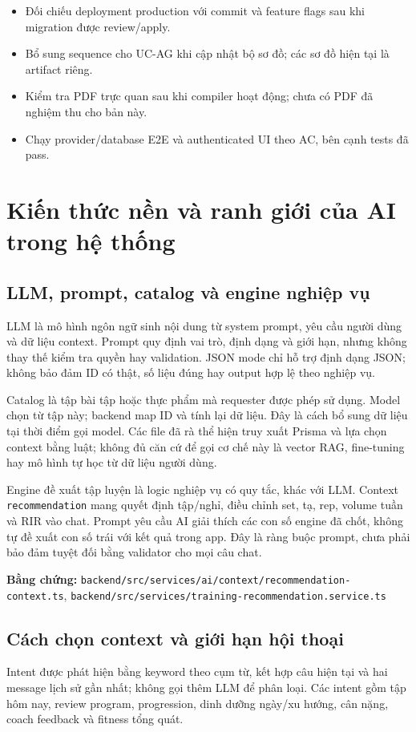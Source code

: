 \documentclass[12pt,a4paper]{article}
\newcommand{\code}[1]{\texttt{#1}}
\newcommand{\evidence}[1]{{\small\nolinkurl{#1}}}
\begin{document}
\begin{itemize}
  \item Đối chiếu deployment production với commit và feature flags sau khi migration được review/apply.
  \item Bổ sung sequence cho UC-AG khi cập nhật bộ sơ đồ; các sơ đồ hiện tại là artifact riêng.
  \item Kiểm tra PDF trực quan sau khi compiler hoạt động; chưa có PDF đã nghiệm thu cho bản này.
  \item Chạy provider/database E2E và authenticated UI theo AC, bên cạnh tests đã pass.
\end{itemize}

\section{Kiến thức nền và ranh giới của AI trong hệ thống}

\subsection{LLM, prompt, catalog và engine nghiệp vụ}
LLM là mô hình ngôn ngữ sinh nội dung từ system prompt, yêu cầu người dùng và dữ liệu context. Prompt quy định vai trò, định dạng và giới hạn, nhưng không thay thế kiểm tra quyền hay validation. JSON mode chỉ hỗ trợ định dạng JSON; không bảo đảm ID có thật, số liệu đúng hay output hợp lệ theo nghiệp vụ.

Catalog là tập bài tập hoặc thực phẩm mà requester được phép sử dụng. Model chọn từ tập này; backend map ID và tính lại dữ liệu. Đây là cách bổ sung dữ liệu tại thời điểm gọi model. Các file đã rà thể hiện truy xuất Prisma và lựa chọn context bằng luật; không đủ căn cứ để gọi cơ chế này là vector RAG, fine-tuning hay mô hình tự học từ dữ liệu người dùng.

Engine đề xuất tập luyện là logic nghiệp vụ có quy tắc, khác với LLM. Context \code{recommendation} mang quyết định tập/nghỉ, điều chỉnh set, tạ, rep, volume tuần và RIR vào chat. Prompt yêu cầu AI giải thích các con số engine đã chốt, không tự đề xuất con số trái với kết quả trong app. Đây là ràng buộc prompt, chưa phải bảo đảm tuyệt đối bằng validator cho mọi câu chat.

\textbf{Bằng chứng:} \evidence{backend/src/services/ai/context/recommendation-context.ts}, \evidence{backend/src/services/training-recommendation.service.ts}

\subsection{Cách chọn context và giới hạn hội thoại}
Intent được phát hiện bằng keyword theo cụm từ, kết hợp câu hiện tại và hai message lịch sử gần nhất; không gọi thêm LLM để phân loại. Các intent gồm tập hôm nay, review program, progression, dinh dưỡng ngày/xu hướng, cân nặng, coach feedback và fitness tổng quát.
\end{document}
